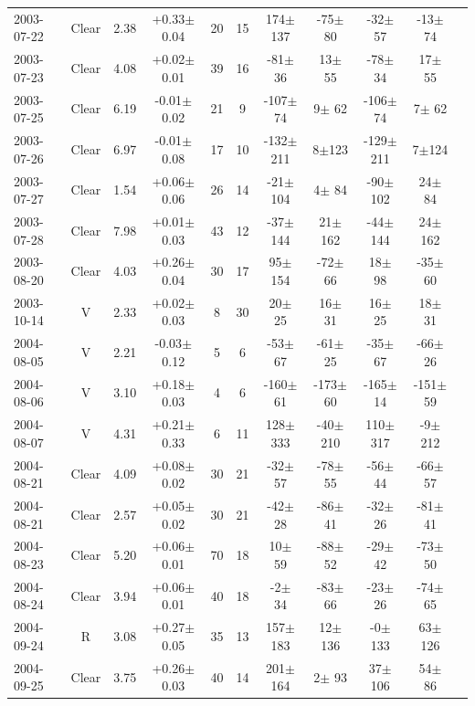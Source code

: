 \documentclass[12pt,a4paper]{report}
\begin{document}
\begin{landscape}
\begin{longtable}{|l|c|c|c|c|c|c|c|c|c|c|}
2003-07-22 & Clear & 2.38 & +0.33$\pm$0.04 &  20 &  15 &  174$\pm$137 &  -75$\pm$ 80 &  -32$\pm$ 57 &  -13$\pm$ 74 \\ 
2003-07-23 & Clear & 4.08 & +0.02$\pm$0.01 &  39 &  16 &  -81$\pm$ 36 &   13$\pm$ 55 &  -78$\pm$ 34 &   17$\pm$ 55 \\ 
2003-07-25 & Clear & 6.19 & -0.01$\pm$0.02 &  21 &   9 & -107$\pm$ 74 &    9$\pm$ 62 & -106$\pm$ 74 &    7$\pm$ 62 \\ 
2003-07-26 & Clear & 6.97 & -0.01$\pm$0.08 &  17 &  10 & -132$\pm$211 &    8$\pm$123 & -129$\pm$211 &    7$\pm$124 \\ 
2003-07-27 & Clear & 1.54 & +0.06$\pm$0.06 &  26 &  14 &  -21$\pm$104 &    4$\pm$ 84 &  -90$\pm$102 &   24$\pm$ 84 \\ 
2003-07-28 & Clear & 7.98 & +0.01$\pm$0.03 &  43 &  12 &  -37$\pm$144 &   21$\pm$162 &  -44$\pm$144 &   24$\pm$162 \\ 
2003-08-20 & Clear & 4.03 & +0.26$\pm$0.04 &  30 &  17 &   95$\pm$154 &  -72$\pm$ 66 &   18$\pm$ 98 &  -35$\pm$ 60 \\ 
2003-10-14 & V     & 2.33 & +0.02$\pm$0.03 &   8 &  30 &   20$\pm$ 25 &   16$\pm$ 31 &   16$\pm$ 25 &   18$\pm$ 31 \\ 
2004-08-05 & V     & 2.21 & -0.03$\pm$0.12 &   5 &   6 &  -53$\pm$ 67 &  -61$\pm$ 25 &  -35$\pm$ 67 &  -66$\pm$ 26 \\ 
2004-08-06 & V     & 3.10 & +0.18$\pm$0.03 &   4 &   6 & -160$\pm$ 61 & -173$\pm$ 60 & -165$\pm$ 14 & -151$\pm$ 59 \\ 
2004-08-07 & V     & 4.31 & +0.21$\pm$0.33 &   6 &  11 &  128$\pm$333 &  -40$\pm$210 &  110$\pm$317 &   -9$\pm$212 \\ 
2004-08-21 & Clear & 4.09 & +0.08$\pm$0.02 &  30 &  21 &  -32$\pm$ 57 &  -78$\pm$ 55 &  -56$\pm$ 44 &  -66$\pm$ 57 \\ 
2004-08-21 & Clear & 2.57 & +0.05$\pm$0.02 &  30 &  21 &  -42$\pm$ 28 &  -86$\pm$ 41 &  -32$\pm$ 26 &  -81$\pm$ 41 \\ 
2004-08-23 & Clear & 5.20 & +0.06$\pm$0.01 &  70 &  18 &   10$\pm$ 59 &  -88$\pm$ 52 &  -29$\pm$ 42 &  -73$\pm$ 50 \\ 
2004-08-24 & Clear & 3.94 & +0.06$\pm$0.01 &  40 &  18 &   -2$\pm$ 34 &  -83$\pm$ 66 &  -23$\pm$ 26 &  -74$\pm$ 65 \\ 
2004-09-24 & R     & 3.08 & +0.27$\pm$0.05 &  35 &  13 &  157$\pm$183 &   12$\pm$136 &   -0$\pm$133 &   63$\pm$126 \\ 
2004-09-25 & Clear & 3.75 & +0.26$\pm$0.03 &  40 &  14 &  201$\pm$164 &    2$\pm$ 93 &   37$\pm$106 &   54$\pm$ 86 \\ 

\end{longtable}
\end{landscape}
\end{document}
